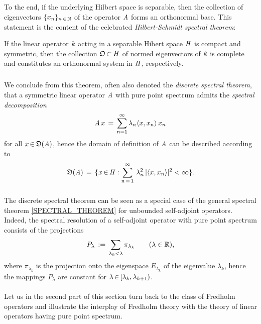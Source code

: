 \documentclass[11pt,twoside]{article}
\begin{document}
\subsection{} %
To the end,
if the underlying Hilbert space is separable,
then the collection of eigenvectors $\{x_n\}_{n {\,\in\,} {\mathbb{N}}}$
of the operator $\mathit{A}$ forms an orthonormal base.
This statement is the content of
the celebrated \textit{Hilbert-Schmidt} \textit{spectral theorem}:

\begin{theorem}\label{DISCRETE_SPECTRAL_THEOREM}
If the linear operator $k$
acting in a separable Hibert space $\mathit{H}$
is compact and symmetric,
then the collection $\mathfrak{O} {\,\subset\,} \mathit{H}$ of normed eigenvectors of $k$
is complete and constitutes an orthonormal system in $\mathit{H}$,
respectively.
\end{theorem}

\subparagraph{} %
We conclude from this theorem,
often also denoted the \textit{discrete spectral theorem},
that a symmetric linear operator $\mathit{A}$ with pure point spectrum
admits the \textit{spectral decomposition}
\[
\mathit{A} \,x \,=\, \sum_{n=1}^{\infty} \lambda_n \langle x,x_n \rangle \, x_n
\]
for all $x {\,\in\,} \mathfrak{D}(\mathit{A})$,
hence the domain of definition of $\mathit{A}$ can be described according to
\[
\domain{\linA} \=
\{x \xeof \hilH:
\sum_{n \eq 1}^{\infty} \, \lambda_n^2 \, \abs{\scalar{x}{x_n}} ^2 < \infty \}.
\]

\subparagraph{} %
The discrete spectral theorem can be seen as a special case
of the general spectral theorem \ref{SPECTRAL_THEOREM}
for unbounded self-adjoint operators.
Indeed,
the spectral resolution of a self-adjoint operator with pure point spectrum
consists of the projections
\[
P_{\lambda} \,:=\, \sum_{\lambda_k < \lambda} \pi_{\lambda_k}
\quad \quad (\lambda \in {\mathbb{R}}),
\]
where $\pi_{\lambda_k}$ is the projection onto the eigenspace $E_{\lambda_k}$
of the eigenvalue $\lambda_k$,
hence the mappings $P_{\lambda}$ are constant for
$\lambda {\,\in\,} [\lambda_k,\lambda_{k+1})$.

\paragraph{} %
Let us in the second part of this section
turn back to the class of Fredholm operators
and illustrate the interplay of Fredholm theory
with the theory of linear operators having pure point spectrum.
\end{document}
